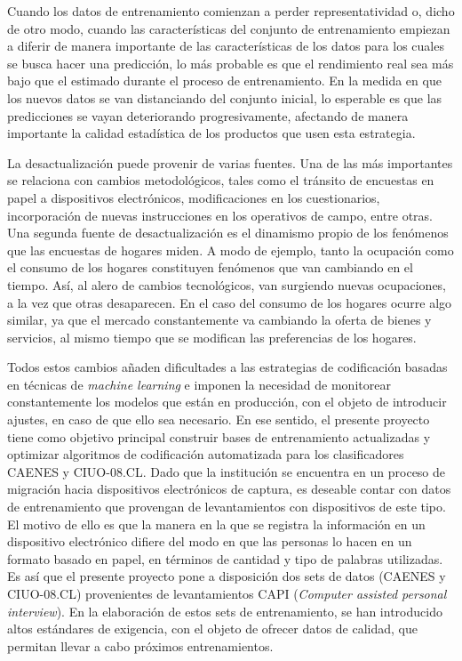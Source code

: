 \documentclass[
  12pt,
  spanish,
]{article}
\begin{document}
Cuando los datos de entrenamiento comienzan a perder representatividad
o, dicho de otro modo, cuando las características del conjunto de
entrenamiento empiezan a diferir de manera importante de las
características de los datos para los cuales se busca hacer una
predicción, lo más probable es que el rendimiento real sea más bajo que
el estimado durante el proceso de entrenamiento. En la medida en que los
nuevos datos se van distanciando del conjunto inicial, lo esperable es
que las predicciones se vayan deteriorando progresivamente, afectando de
manera importante la calidad estadística de los productos que usen esta
estrategia.

La desactualización puede provenir de varias fuentes. Una de las más
importantes se relaciona con cambios metodológicos, tales como el
tránsito de encuestas en papel a dispositivos electrónicos,
modificaciones en los cuestionarios, incorporación de nuevas
instrucciones en los operativos de campo, entre otras. Una segunda
fuente de desactualización es el dinamismo propio de los fenómenos que
las encuestas de hogares miden. A modo de ejemplo, tanto la ocupación
como el consumo de los hogares constituyen fenómenos que van cambiando
en el tiempo. Así, al alero de cambios tecnológicos, van surgiendo
nuevas ocupaciones, a la vez que otras desaparecen. En el caso del
consumo de los hogares ocurre algo similar, ya que el mercado
constantemente va cambiando la oferta de bienes y servicios, al mismo
tiempo que se modifican las preferencias de los hogares.

Todos estos cambios añaden dificultades a las estrategias de
codificación basadas en técnicas de \emph{machine learning} e imponen la
necesidad de monitorear constantemente los modelos que están en
producción, con el objeto de introducir ajustes, en caso de que ello sea
necesario. En ese sentido, el presente proyecto tiene como objetivo
principal construir bases de entrenamiento actualizadas y optimizar
algoritmos de codificación automatizada para los clasificadores CAENES y
CIUO-08.CL. Dado que la institución se encuentra en un proceso de
migración hacia dispositivos electrónicos de captura, es deseable contar
con datos de entrenamiento que provengan de levantamientos con
dispositivos de este tipo. El motivo de ello es que la manera en la que
se registra la información en un dispositivo electrónico difiere del
modo en que las personas lo hacen en un formato basado en papel, en
términos de cantidad y tipo de palabras utilizadas. Es así que el
presente proyecto pone a disposición dos sets de datos (CAENES y
CIUO-08.CL) provenientes de levantamientos CAPI (\emph{Computer assisted
personal interview}). En la elaboración de estos sets de entrenamiento,
se han introducido altos estándares de exigencia, con el objeto de
ofrecer datos de calidad, que permitan llevar a cabo próximos
entrenamientos.
\end{document}
